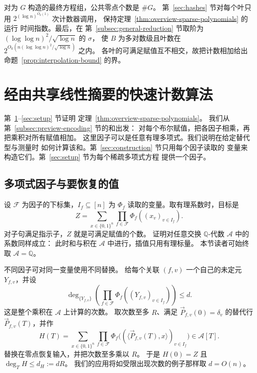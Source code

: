 \documentclass[11pt,reqno]{amsart}
\numberwithin{equation}{section}
\theoremstyle{definition}\newtheorem{definition}[theorem]{定义}
\theoremstyle{remark}\newtheorem{remark}[theorem]{注}
\renewcommand{\le}{\leqslant}
\begin{document}
对为 $G$ 构造的最终方程组，公共零点个数是 $\#G$。
第~\ref{sec:hashes} 节对每个叶只用
$2^{(\log n)^{O_k(1)}}$ 次计数器调用，
保持定理~\ref{thm:overview-sparse-polynomials} 的运行
时间指数。最后，在
第~\ref{subsec:general-reduction} 节取阶为
$(\log\log n)^2/\sqrt{\log n}$ 的 $\sigma$，
使 $B$ 为多对数级且叶数在
$2^{O_k(n(\log\log n)^2/\sqrt{\log n})}$ 之内。
各叶的可满足赋值互不相交，故把计数相加给出
命题~\ref{prop:interpolation-bound} 的界。
\section{经由共享线性摘要的快速计数算法}\label{sec:counting}
第~\ref{sec:counting}--\ref{sec:setup} 节证明
定理~\ref{thm:overview-sparse-polynomials}。
我们从第~\ref{subsec:preview-encoding} 节的和出发：
对每个布尔赋值，把各因子相乘，再把乘积对所有赋值相加。
这里因子可以是任意有理多项式。我们说明在给定替代型与测量时
如何计算该和。第~\ref{sec:construction} 节只用每个因子读取的
变量来构造它们。第~\ref{sec:setup} 节为每个稀疏多项式方程
提供一个因子。

\subsection{多项式因子与要恢复的值}
\label{subsec:product-interface}
设 $\mathcal F$ 为因子的下标集，$I_f\subseteq[n]$ 为 $\Phi_f$
读取的变量。取有理系数时，目标是
\begin{equation}\label{eq:general-product-sum}
 Z=\sum_{x\in\{0,1\}^n}\prod_{f\in\mathcal F}\Phi_f((x_v)_{v\in I_f}).
\end{equation}
对子句满足指示子，$Z$ 就是可满足赋值的个数。
证明对任意交换 $\mathbb Q$-代数 $\mathcal A$ 中的系数同样成立：
此时和与积在 $\mathcal A$ 中进行，插值只用有理标量。
本节读者可始终取 $\mathcal A=\mathbb Q$。

不同因子可对同一变量使用不同替换。
给每个关联 $(f,v)$ 一个自己的未定元 $Y_{f,v}$，并设
\begin{equation}\label{eq:general-product-degree}
 \deg_{\{Y_{f,v}\}}\!
    \left(\prod_{f\in\mathcal F}\Phi_f((Y_{f,v})_{v\in I_f})\right)\le d .
\end{equation}
这是整个乘积在 $\mathcal A$ 上计算的次数。
取次数至多 $R$、满足 $\vec P_{f,v}(0)=\delta_v$ 的替代行
$\vec P_{f,v}(T)$，并作
\begin{equation}\label{eq:general-count-polynomial}
 H(T)=\sum_{x\in\{0,1\}^n}\prod_{f\in\mathcal F}
   \Phi_f\bigl((\langle\vec P_{f,v}(T),x\rangle)_{v\in I_f}\bigr)
   \in\mathcal A[T].
\end{equation}
替换在零点恢复输入，并把次数至多乘以 $R$。
于是 $H(0)=Z$ 且 $\deg_T H\le d_H:=dR$。
我们的应用将如受限出现次数的例子那样取 $d=O(n)$。
\end{document}
